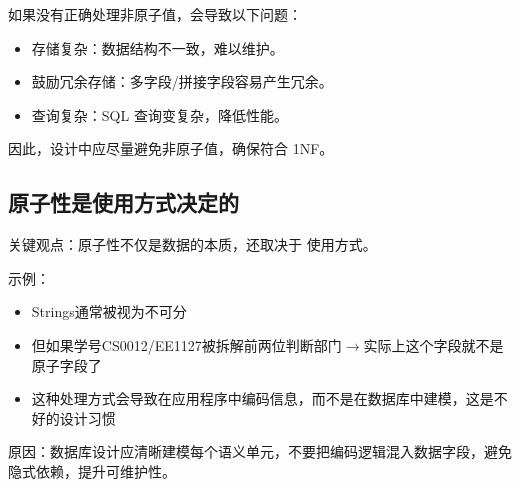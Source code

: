如果没有正确处理非原子值，会导致以下问题：
\begin{itemize}
    \item 存储复杂：数据结构不一致，难以维护。
    \item 鼓励冗余存储：多字段/拼接字段容易产生冗余。
    \item 查询复杂：SQL 查询变复杂，降低性能。
\end{itemize}

因此，设计中应尽量避免非原子值，确保符合 1NF。

\subsection{原子性是使用方式决定的}

关键观点：原子性不仅是数据的本质，还取决于 使用方式。

示例：
\begin{itemize}
    \item Strings通常被视为不可分
    \item 但如果学号CS0012/EE1127被拆解前两位判断部门$\to$实际上这个字段就不是原子字段了
    \item 这种处理方式会导致在应用程序中编码信息，而不是在数据库中建模，这是不好的设计习惯
\end{itemize}

原因：数据库设计应清晰建模每个语义单元，不要把编码逻辑混入数据字段，避免隐式依赖，提升可维护性。